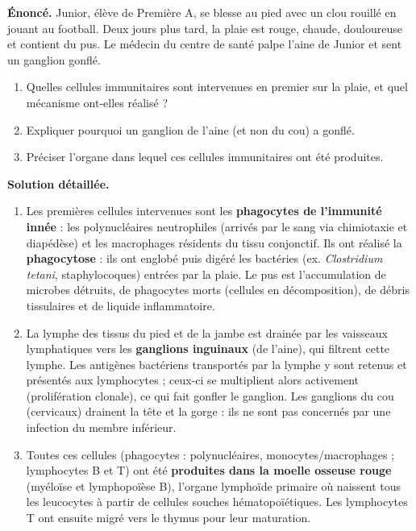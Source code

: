 \documentclass[11pt]{article}
\begin{document}
\begin{exoresolu}
\textbf{Énoncé.} Junior, élève de Première A, se blesse au pied avec un clou rouillé en jouant au football. Deux jours plus tard, la plaie est rouge, chaude, douloureuse et contient du pus. Le médecin du centre de santé palpe l'aine de Junior et sent un ganglion gonflé.
\begin{enumerate}
\item Quelles cellules immunitaires sont intervenues en premier sur la plaie, et quel mécanisme ont-elles réalisé ?
\item Expliquer pourquoi un ganglion de l'aine (et non du cou) a gonflé.
\item Préciser l'organe dans lequel ces cellules immunitaires ont été produites.
\end{enumerate}
\tcblower
\textbf{Solution détaillée.}
\begin{enumerate}
\item Les premières cellules intervenues sont les \textbf{phagocytes de l'immunité innée} : les polynucléaires neutrophiles (arrivés par le sang via chimiotaxie et diapédèse) et les macrophages résidents du tissu conjonctif. Ils ont réalisé la \textbf{phagocytose} : ils ont englobé puis digéré les bactéries (ex. \emph{Clostridium tetani}, staphylocoques) entrées par la plaie. Le pus est l'accumulation de microbes détruits, de phagocytes morts (cellules en décomposition), de débris tissulaires et de liquide inflammatoire.
\item La lymphe des tissus du pied et de la jambe est drainée par les vaisseaux lymphatiques vers les \textbf{ganglions inguinaux} (de l'aine), qui filtrent cette lymphe. Les antigènes bactériens transportés par la lymphe y sont retenus et présentés aux lymphocytes ; ceux-ci se multiplient alors activement (prolifération clonale), ce qui fait gonfler le ganglion. Les ganglions du cou (cervicaux) drainent la tête et la gorge : ils ne sont pas concernés par une infection du membre inférieur.
\item Toutes ces cellules (phagocytes : polynucléaires, monocytes/macrophages ; lymphocytes B et T) ont été \textbf{produites dans la moelle osseuse rouge} (myéloïse et lymphopoïèse B), l'organe lymphoïde primaire où naissent tous les leucocytes à partir de cellules souches hématopoïétiques. Les lymphocytes T ont ensuite migré vers le thymus pour leur maturation.
\end{enumerate}
\end{exoresolu}
\end{document}
